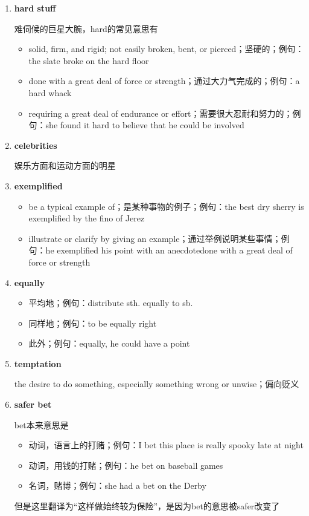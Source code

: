 \documentclass[UTF8]{ctexart}
\begin{document}
\begin{enumerate}
\item \textbf{hard stuff}\label{voc:6}

难伺候的巨星大腕，hard的常见意思有
\begin{itemize}
\item solid, firm, and rigid; not easily broken, bent, or pierced；坚硬的；例句：the slate broke on the hard floor
\item done with a great deal of force or strength；通过大力气完成的；例句：a hard whack
\item requiring a great deal of endurance or effort；需要很大忍耐和努力的；例句：she found it hard to believe that he could be involved
\end{itemize}

\item \textbf{celebrities}\label{voc:7}

娱乐方面和运动方面的明星

\item \textbf{exemplified}\label{voc:8}

\begin{itemize}
\item be a typical example of；是某种事物的例子；例句：the best dry sherry is exemplified by the fino of Jerez
\item illustrate or clarify by giving an example；通过举例说明某些事情；例句：he exemplified his point with an anecdotedone with a great deal of force or strength
\end{itemize}

\item \textbf{equally}\label{voc:9}

\begin{itemize}
\item 平均地；例句：distribute sth. equally to sb.
\item 同样地；例句：to be equally right
\item 此外；例句：equally, he could have a point
\end{itemize}

\item \textbf{temptation}\label{voc:10}

the desire to do something, especially something wrong or unwise；偏向贬义

\item \textbf{safer bet}\label{voc:11}

bet本来意思是
\begin{itemize}
\item 动词，语言上的打赌；例句：I bet this place is really spooky late at night
\item 动词，用钱的打赌；例句：he bet on baseball games
\item 名词，赌博；例句：she had a bet on the Derby
\end{itemize}
但是这里翻译为“这样做始终较为保险”，是因为bet的意思被safer改变了


\end{enumerate}
\end{document}
